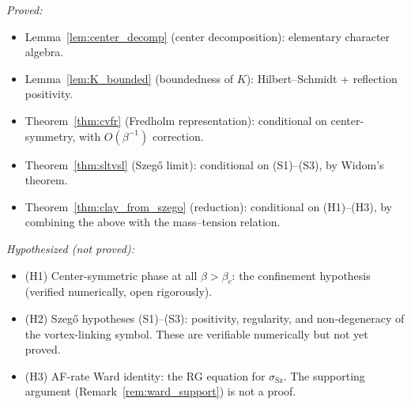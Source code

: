 \begin{remark}
\label{rem:cv_status}
\emph{Proved:}
\begin{itemize}
\item Lemma~\ref{lem:center_decomp} (center decomposition):
elementary character algebra.
\item Lemma~\ref{lem:K_bounded} (boundedness of $K$):
Hilbert--Schmidt + reflection positivity.
\item Theorem~\ref{thm:cvfr} (Fredholm representation): conditional
on center-symmetry, with $O(\beta^{-1})$ correction.
\item Theorem~\ref{thm:sltvsl} (Szeg\H{o} limit): conditional on
(S1)--(S3), by Widom's theorem.
\item Theorem~\ref{thm:clay_from_szego} (reduction): conditional
on (H1)--(H3), by combining the above with the mass--tension
relation.
\end{itemize}
\emph{Hypothesized (not proved):}
\begin{itemize}
\item (H1) Center-symmetric phase at all $\beta>\beta_{c}$:
the confinement hypothesis (verified numerically, open
rigorously).
\item (H2) Szeg\H{o} hypotheses (S1)--(S3): positivity,
regularity, and non-degeneracy of the vortex-linking symbol.
These are verifiable numerically but not yet proved.
\item (H3) AF-rate Ward identity: the RG equation for
$\sigma_{\mathrm{Sz}}$. The supporting argument
(Remark~\ref{rem:ward_support}) is not a proof.
\end{itemize}
\end{remark}

